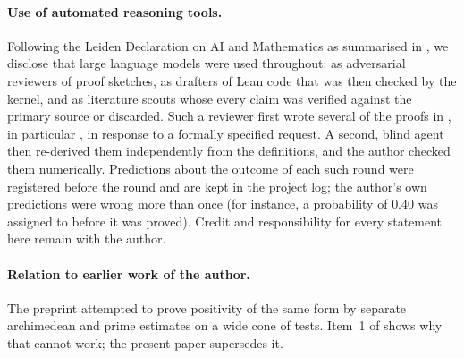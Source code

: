 \paragraph{Use of automated reasoning tools.} Following the Leiden Declaration on AI and Mathematics as summarised in
\cite[\S8]{TERENCETAO-2026}, we disclose that large language models were used throughout: as adversarial reviewers of proof
sketches, as drafters of Lean code that was then checked by the kernel, and as literature scouts whose every claim was verified against
the primary source or discarded. Such a reviewer first wrote several of the proofs in , in particular ,
in response to a formally specified request. A second, blind agent then re-derived them independently from the definitions,
and the author checked them numerically. Predictions about the outcome of each such round were
registered before the round and are kept in the project log; the author's own predictions were wrong more than once (for instance,
a probability of $0.40$ was assigned to  before it was proved). Credit and responsibility for every statement here
remain with the author.

\paragraph{Relation to earlier work of the author.} The preprint \cite{Malamutmann2025} attempted to prove positivity of the same form by
separate archimedean and prime estimates on a wide cone of tests. Item~1 of  shows why that cannot work; the present paper supersedes it.
